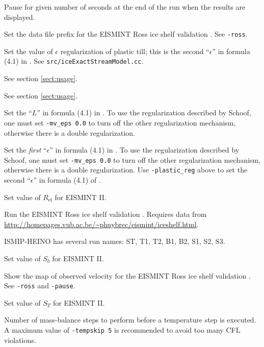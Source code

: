 \documentclass[11pt,final]{amsart}
\renewcommand{\t}[1]{\texttt{#1}}
\newcommand{\eps}{\epsilon}
\begin{document}
    Pause for given number of seconds at the end of the run when the results are displayed.

    Set the data file prefix for the EISMINT Ross ice shelf validation \cite{MacAyealetal}.  See \verb|-ross|.

    Set the value of $\eps$ regularization of plastic till; this is the second ``$\eps$'' in formula (4.1) in \cite{SchoofStream}.  See \t{src/iceExactStreamModel.cc}.

  See section \ref{sect:usage}.

  See section \ref{sect:usage}.

  Set the ``$L$'' in formula (4.1) in \cite{SchoofStream}.  To use the regularization described by Schoof, one must set \verb|-mv_eps 0.0| to turn off the other regularization mechanism, otherwise there is a double regularization.

  Set the \emph{first} ``$\eps$'' in formula (4.1) in \cite{SchoofStream}.  To use the regularization described by Schoof, one must set \verb|-mv_eps 0.0| to turn off the other regularization mechanism, otherwise there is a double regularization.  Use \verb|-plastic_reg| above to set the second ``$\eps$'' in formula (4.1) of \cite{SchoofStream}.

    Set value of $R_{\text{el}}$ for EISMINT II.

    Run the EISMINT Ross ice shelf validation \cite{MacAyealetal}.  Requires data from \url{http://homepages.vub.ac.be/~phuybrec/eismint/iceshelf.html}.

  ISMIP-HEINO has several run names: ST, T1, T2, B1, B2, S1, S2, S3.

    Set value of $S_b$ for EISMINT II.

    Show the map of observed velocity for the EISMINT Ross ice shelf validation \cite{MacAyealetal}.  See \verb|-ross| and \verb|-pause|.

    Set value of $S_T$ for EISMINT II.

  Number of mass-balance steps to perform before a temperature step is executed.  A maximum value of \verb|-tempskip 5| is recommended to avoid too many CFL violations.
\end{document}
